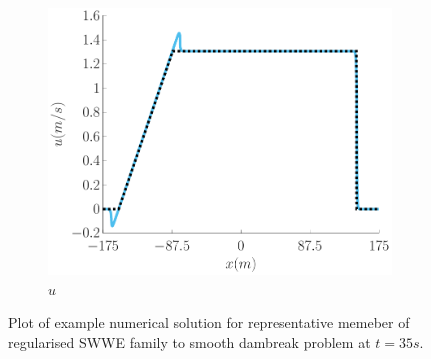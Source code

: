 \documentclass[10pt]{article}
\begin{document}
\begin{figure}
\begin{subfigure}{0.32\textwidth}
	\centering
	\includegraphics[width=\textwidth]{./Figures/Simulations/Study/RegSWWE/Convergence/u.pdf}
	\caption{$u$}
	\end{subfigure}
	\caption{Plot of example numerical solution for representative memeber of regularised SWWE family to smooth dambreak problem at $t=35s$.}
\end{figure}
\end{document}
